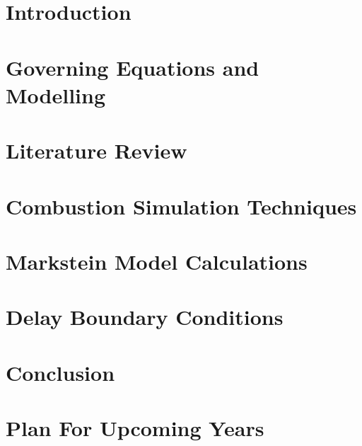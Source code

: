 \documentclass[lmr,second,hyperref,rgb,hyperref,dvipsnames]{uom_thesis_casson}
\title{\xmp@Title}
\author{\xmp@Author}
\begin{document}
\maketitle



\uomtoc

\uomstartmainbody %

\chapter{Introduction} \label{ch:intro}


\chapter{Governing Equations and Modelling} \label{ch:govern-eqns}


\chapter{Literature Review} \label{ch:lit-review}


\chapter{Combustion Simulation Techniques} \label{ch:techniques}


\chapter{Markstein Model Calculations} \label{ch:markstein}


\chapter{Delay Boundary Conditions} \label{ch:delay-bcs}


\chapter{Conclusion} \label{ch:conc}


\chapter{Plan For Upcoming Years} \label{ch:plan}



\printbibliography[title={References},heading=bibintoc]
\end{document}

